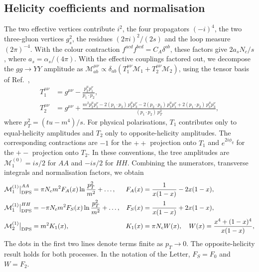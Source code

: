 \documentclass[%
 onecolumn,
 superscriptaddress,
 preprintnumbers,
 nofootinbib,
 amsmath,amssymb,
 aps,
 prl,
]{revtex4-2}
\newcommand{\M}{\mathcal M}
\begin{document}
\subsection{Helicity coefficients and normalisation}

The two effective vertices contribute $i^2$, the
four propagators $(-i)^4$, the two three-gluon
vertices $g_s^2$, the residues $(2\pi i)^2/(2s)$
and the loop measure $(2\pi)^{-4}$.
With the colour contraction
$f^{acd}f^{bcd}=C_A\delta^{ab}$, these factors
give $2a_sN_c/s$, where $a_s=\alpha_s/(4\pi)$.
%
With the effective couplings factored out, we
decompose the $gg\to YY$ amplitude as
$\M^{\mu\nu}_{ab}\propto
\delta_{ab}(T_1^{\mu\nu}\M_1+T_2^{\mu\nu}\M_2)$,
using the tensor basis of Ref.~\cite{P1},
\begin{equation}
\begin{aligned}
T_1^{\mu\nu}&=g^{\mu\nu}-\frac{p_2^\mu p_1^\nu}{p_1\cdot p_2},\\
T_2^{\mu\nu}&=g^{\mu\nu}+\frac{m^2p_2^\mu p_1^\nu-2(p_1\cdot p_3)\,p_2^\mu p_3^\nu-2(p_2\cdot p_3)\,p_3^\mu p_1^\nu
+2(p_1\cdot p_2)\,p_3^\mu p_3^\nu}{(p_1\cdot p_2)\,p_T^2},
\end{aligned}
\label{eq:tensors}
\end{equation}
where $p_T^2=(tu-m^4)/s$.
For physical polarisations, $T_1$ contributes only
to equal-helicity amplitudes and $T_2$ only to
opposite-helicity amplitudes. The corresponding
contractions are $-1$ for the $++$ projection
onto $T_1$ and $e^{2i\phi_q}$ for the $+-$
projection onto $T_2$.
In these conventions, the tree amplitudes are
$\M_1^{(0)}=is/2$ for $AA$ and $-is/2$ for $HH$.
Combining the numerators, transverse integrals
and normalisation factors, we obtain
\begin{align}
\M_1^{(1)}\big|_{\rm DPS}^{AA}&=\pi N_cm^2F_A(x)\ln\frac{p_T^2}{m^2}+\dots,&
F_A(x)&=\frac1{x(1-x)}-2x(1-x),\label{eq:FA}\\
\M_1^{(1)}\big|_{\rm DPS}^{HH}&=-\pi N_cm^2F_S(x)\ln\frac{p_T^2}{m^2}+\dots,&
F_S(x)&=\frac1{x(1-x)}+2x(1-x),\label{eq:FS}\\
\M_2^{(1)}\big|_{\rm DPS}&=m^2K_1(x),&
K_1(x)&=\pi N_cW(x),\quad W(x)=\frac{x^4+(1-x)^4}{x(1-x)},\label{eq:K1}
\end{align}
The dots in the first two lines denote terms
finite as $p_T\to0$. The opposite-helicity
result holds for both processes. In the notation
of the Letter, $F_S=F_0$ and $W=F_2$.
\end{document}
